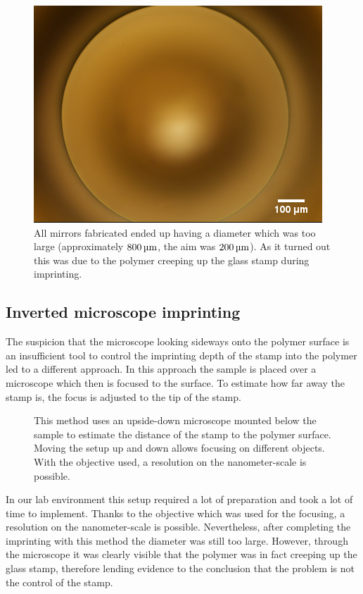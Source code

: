 \begin{figure}[H]
	\includegraphics[scale=0.6]{source/mirror_too_large}
	\caption{All mirrors fabricated ended up having a diameter which was too large (approximately $800\um$, the aim was $200\um$). As it turned out this was due to the polymer creeping up the glass stamp during imprinting.}
\end{figure}

\subsection{Inverted microscope imprinting}
The suspicion that the microscope looking sideways onto the polymer surface is an insufficient tool to control the imprinting depth of the stamp into the polymer led to a different approach. In this approach the sample is placed over a microscope which then is focused to the surface. To estimate how far away the stamp is, the focus is adjusted to the tip of the stamp.

\begin{figure}[H]
	
	\caption{This method uses an upside-down microscope mounted below the sample to estimate the distance of the stamp to the polymer surface. Moving the setup up and down allows focusing on different objects. With the objective used, a resolution on the nanometer-scale is possible.}
\end{figure}
In our lab environment this setup required a lot of preparation and took a lot of time to implement. Thanks to the objective which was used for the focusing, a resolution on the nanometer-scale is possible. Nevertheless, after completing the imprinting with this method the diameter was still too large. However, through the microscope it was clearly visible that the polymer was in fact creeping up the glass stamp, therefore lending evidence to the conclusion that the problem is not the control of the stamp.

